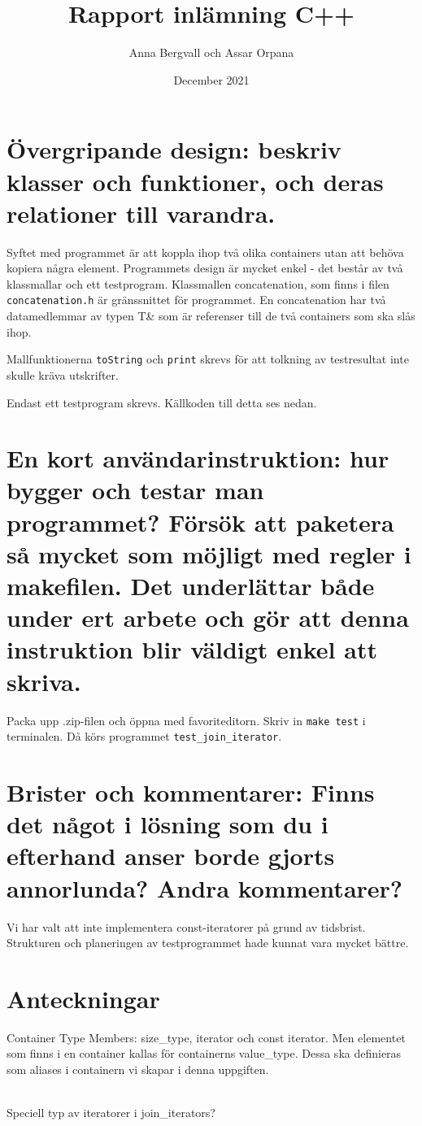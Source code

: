 \documentclass{article}
\title{Rapport inlämning C++}
\author{Anna Bergvall och Assar Orpana}
\date{December 2021}
\begin{document}
\maketitle

\section{Övergripande design: beskriv klasser och funktioner, och deras relationer till varandra.}

Syftet med programmet är att koppla ihop två olika containers utan att behöva kopiera några element. Programmets design är mycket enkel - det består av två klassmallar och ett testprogram. Klassmallen concatenation, som finns i filen \verb 'concatenation.h' är gränssnittet för programmet. En concatenation har två datamedlemmar av typen T& som är referenser till de två containers som ska slås ihop. 







Mallfunktionerna \verb 'toString' och \verb 'print' skrevs för att tolkning av testresultat inte skulle kräva utskrifter.



Endast ett testprogram skrevs. Källkoden till detta ses nedan.




\section{En kort användarinstruktion: hur bygger och testar man programmet? Försök att paketera
så mycket som möjligt med regler i makefilen. Det underlättar både under ert arbete och
gör att denna instruktion blir väldigt enkel att skriva.}

Packa upp .zip-filen och öppna med favoriteditorn. Skriv in \verb "make test" i terminalen. Då körs programmet \verb 'test_join_iterator'.

\section{Brister och kommentarer: Finns det något i lösning som du i efterhand anser borde gjorts
annorlunda? Andra kommentarer?}

Vi har valt att inte implementera const-iteratorer på grund av tidsbrist. Strukturen och planeringen av testprogrammet hade kunnat vara mycket bättre. 

\section{Anteckningar}

Container Type Members: size\_type, iterator och const iterator. Men elementet som finns i en container kallas för containerns value\_type. Dessa ska definieras som aliases i containern vi skapar i denna uppgiften.

\\

Speciell typ av iteratorer i join\_iterators?
\end{document}
